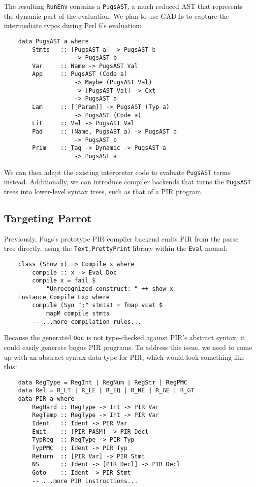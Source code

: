 \documentclass[]{sigplanconf}
\newcommand{\code}[1]{\texttt{#1}}
\begin{document}
The resulting \code{RunEnv} contains a \code{PugsAST}, a much reduced AST that
represents the dynamic part of the evaluation.  We plan to use GADTs to capture
the intermediate types during Perl 6's evaluation:

\begin{lstlisting}
    data PugsAST a where
        Stmts   :: [PugsAST a] -> PugsAST b
                    -> PugsAST b
        Var     :: Name -> PugsAST Val
        App     :: PugsAST (Code a)
                    -> Maybe (PugsAST Val)
                    -> [PugsAST Val] -> Cxt
                    -> PugsAST a
        Lam     :: [[Param]] -> PugsAST (Typ a)
                    -> PugsAST (Code a)
        Lit     :: Val -> PugsAST Val
        Pad     :: (Name, PugsAST a) -> PugsAST b
                    -> PugsAST b
        Prim    :: Tag -> Dynamic -> PugsAST a
                    -> PugsAST a
\end{lstlisting}

We can then adapt the existing interpreter code to evaluate \code{PugsAST}
terms instead.  Additionally, we can introduce compiler backends that turns the
\code{PugsAST} trees into lower-level syntax trees, such as that of a PIR
program.


\subsection{Targeting Parrot}
\label{sec:TargetingParrot}

Previously, Pugs's prototype PIR compiler backend emits PIR from the parse tree
directly, using the \code{Text.PrettyPrint} library within the \code{Eval} monad:

\begin{lstlisting}
    class (Show x) => Compile x where
        compile :: x -> Eval Doc
        compile x = fail $
            "Unrecognized construct: " ++ show x
    instance Compile Exp where
        compile (Syn ";" stmts) = fmap vcat $
            mapM compile stmts
        -- ...more compilation rules...
\end{lstlisting}

Because the generated \code{Doc} is not type-checked against PIR's abstract
syntax, it could easily generate bogus PIR programs.  To address this issue, we
need to come up with an abstract syntax data type for PIR, which would look
something like this:

\begin{lstlisting}
    data RegType = RegInt | RegNum | RegStr | RegPMC
    data Rel = R_LT | R_LE | R_EQ | R_NE | R_GE | R_GT
    data PIR a where
        RegHard :: RegType -> Int -> PIR Var
        RegTemp :: RegType -> Int -> PIR Var
        Ident   :: Ident -> PIR Var
        Emit    :: [PIR PASM] -> PIR Decl
        TypReg  :: RegType -> PIR Typ
        TypPMC  :: Ident -> PIR Typ
        Return  :: [PIR Var] -> PIR Stmt
        NS      :: Ident -> [PIR Decl] -> PIR Decl
        Goto    :: Ident -> PIR Stmt
        -- ...more PIR instructions...
\end{lstlisting}
\end{document}
